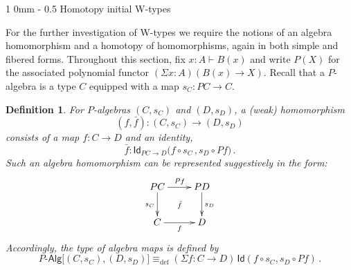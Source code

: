 \documentclass[10pt,a4paper,oneside,reqno]{amsart}
\makeatletter
\numberwithin{equation}{section}
\renewcommand{\section}{\@startsection
  {section}%
   {1}%
  {0mm}%
   {-\baselineskip}%
  {0.5\baselineskip}%
   {\Large\bfseries}}%
\theoremstyle{mythm}
\theoremstyle{mydef}
\newtheorem{definition}[theorem]{Definition}
\theoremstyle{myrmk}
\newcommand{\deq}{\equiv}
\newcommand{\defeq}{\deq_{\mathrm{def}}}
\newcommand{\prd}[1]{\Pi_{#1}}
\newcommand{\lam}[1]{\lambda_{#1}}
\newcommand{\Id}{\mathsf{Id}}
\newcommand{\id}[1]{\Id_{#1}}
\newcommand{\W}{\mathsf{W}}
\newcommand{\wsup}{\mathsf{sup}}
\newcommand{\UU}{\mathsf{U}}
\newcommand{\Palg}{P\text{-}\mathsf{Alg}}
\makeatother
\begin{document}
%



\section{Homotopy initial W-types}

For the further investigation of W-types we require the notions of an algebra homomorphism and a homotopy of homomorphisms, again in both simple and fibered forms.  Throughout this section, fix $x:A\vdash B(x)$ and write $P(X)$ for the associated polynomial functor $(\Sigma x : A) (B(x) \rightarrow X)$.  Recall that a $P$-algebra is a type $C$ equipped with a map
$s_C :  PC \rightarrow C$.  

\begin{definition}
For $P$-algebras $(C,s_C)$ and $(D,s_D)$, a \emph{(weak) 
homomorphism}  $$(f, \bar{f}) : (C, s_C) \rightarrow (D, s_D)$$
consists of a map $f : C \rightarrow D$ and an identity,
\[
\bar{f} : \id{PC \rightarrow D}\big( f \circ s_C \, ,  s_{D} \circ Pf \big) \, .
\]
Such an algebra homomorphism can be represented suggestively in the form:
\[
\xymatrix{
 PC \ar[d]_{s_C} \ar[r]^{Pf}  \ar@{}[dr]|{\bar{f}} &  PD \ar[d]^{s_D}\\
C \ar[r]_{f}   & D }
\] 
Accordingly, the type of algebra maps is defined by
\[
\Palg
\big[ (C,s_C), (D, s_D)  \big]
 \defeq  
(\Sigma f:  C \rightarrow D) \, \Id(f\circ s_C, s_D\circ Pf) \, .
\]
\end{definition}
\medskip
\end{document}
